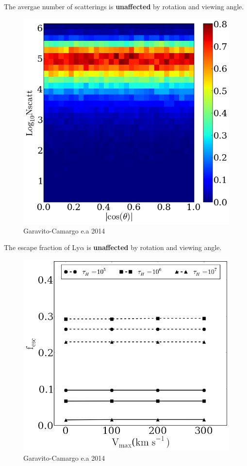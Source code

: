 \documentclass{beamer}
\begin{document}
\begin{frame}{The avergae number of scatterings is \textbf{unaffected} by rotation and viewing angle.}
\begin{figure}
\includegraphics[scale=0.30]{Figures/f9h.png}
\caption*{Garavito-Camargo e.a 2014}
\end{figure}
\end{frame}

\begin{frame}{The escape fraction of Ly$\alpha$ is \textbf{unaffected} by rotation and viewing angle.}
\begin{figure}
\includegraphics[scale=0.30]{Figures/f10.png}
\caption*{Garavito-Camargo e.a 2014}
\end{figure}
\end{frame}
\end{document}
